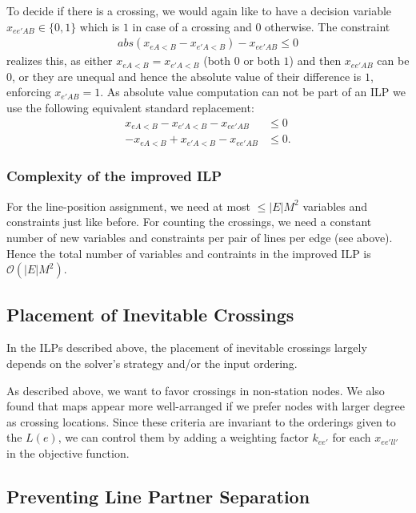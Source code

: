 \documentclass{llncs}
\begin{document}
To decide if there is a crossing, we would again like to have a decision variable $x_{ee'AB} \in \{0,1\}$ which is $1$ in case of a crossing and $0$ otherwise. The constraint
\begin{gather}
	abs(x_{eA<B}-x_{e'A<B}) - x_{ee'AB} \leq 0
\end{gather}
realizes this, as either $x_{eA<B} = x_{e'A<B}$ (both $0$ or both $1$) and then $x_{ee'AB}$ can be $0$, or they are unequal and hence the absolute value of their difference is $1$, enforcing $x_{e'AB}=1$. As absolute value computation can not be part of an ILP we use the following equivalent standard replacement:
\begin{align}
	x_{eA<B} - x_{e'A<B} - x_{ee'AB} &\leq 0 \label{EQ:abs_upper}\\
	-x_{eA<B} + x_{e'A<B} - x_{ee'AB} &\leq 0. \label{EQ:abs_lower}
\end{align}

\subsubsection{Complexity of the improved ILP}
For the line-position assignment, we need at most $\leq |E|M^{2}$ variables and constraints just like before.
For counting the  crossings, we need a constant number of new variables and constraints per pair of lines per edge (see above).
Hence the total number of variables and contraints in the improved ILP is $\mathcal{O}(|E|M^{2})$.

\subsection{Placement of Inevitable Crossings}\label{SEC:crossing_placement}
In the ILPs described above, the placement of inevitable crossings largely depends on the solver's strategy and/or the input ordering.

As described above, we want to favor crossings in non-station nodes.
We also found that maps appear more well-arranged if we prefer nodes with larger degree as crossing locations. Since these criteria are invariant to the orderings given to the $L(e)$, we can control them by adding a weighting factor $k_{ee'}$ for each $x_{ee'll'}$ in the objective function.

\subsection{Preventing Line Partner Separation}\label{SEC:separation}
\end{document}
